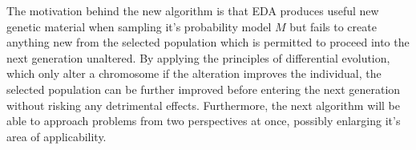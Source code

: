 The motivation behind the new algorithm is that EDA produces useful new genetic material when sampling it's probability model $M$ but fails to create anything new from the selected population which is permitted to proceed into the next generation unaltered. By applying the principles of differential evolution, which only alter a chromosome if the alteration improves the individual, the selected population can be further improved before entering the next generation without risking any detrimental effects. Furthermore, the next algorithm will be able to approach problems from two perspectives at once, possibly enlarging it's area of applicability.
